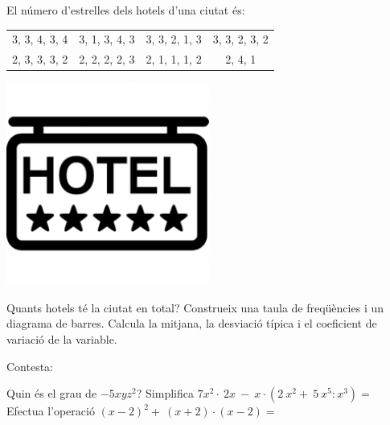\begin{mylist}
	\pagebreak
	\mbox{}
	  \vspace*{-1.75cm} 
	\exer[2] \begin{minipage}[t]{0.7\textwidth}
		  El número d'estrelles dels hotels d'una ciutat és:
		  \vspace{0.25cm}
		\begin{center}
		\begin{tabular}{c c c c}
		3, 3, 4, 3, 4  & 3, 1, 3, 4, 3  & 3, 3, 2, 1, 3  & 3, 3, 2, 3, 2 \\
		2, 3, 3, 3, 2  & 2, 2, 2, 2, 3 &  2, 1, 1, 1, 2 &  2, 4, 1 \\
		\end{tabular}
		\end{center}
	\end{minipage}
	\begin{minipage}{0.3\textwidth}
		\centering
		\vspace{1.5cm}
		\includegraphics[width=0.5\textwidth]{img-12/image4}
	\end{minipage}
		\vspace{-0.5cm}
	\begin{tasks}
		\task Quants hotels té la ciutat en total?
		\task Construeix una taula de freqüències i un diagrama de barres.
		\task  Calcula la mitjana, la desviació típica i el coeficient de variació de la variable.
	\end{tasks}
	
	 
	
	\exer[2]  Contesta:
	\begin{tasks}
		\task  Quin és el grau de $-5xyz^2$?
		\task  Simplifica  $7x^2\cdot \ 2x\ -\ x\cdot \left(2\ x^2+\ 5\ x^5:x^3\right)=$
		\task  Efectua l'operació ${\left(x-2\right)}^2+\ \left(x+2\right)\cdot \left(x-2\right)=$
	\end{tasks}
	

\end{mylist}
